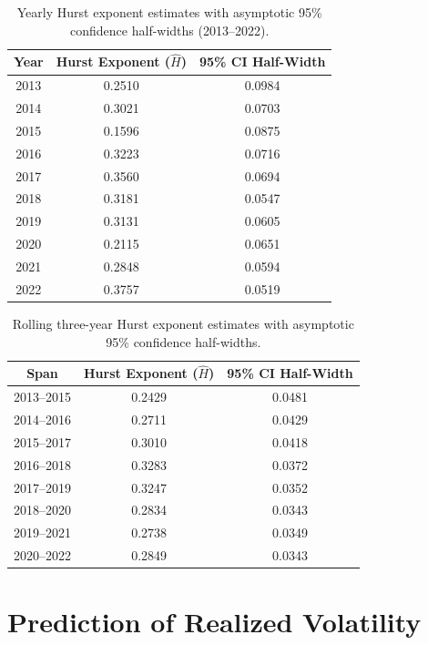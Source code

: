 \documentclass[ecta,nameyear,draft]{econsocart}
\def\wh{\widehat}
\newcommand{\1}{\mathbf 1}
\numberwithin{equation}{section}
\begin{document}
\begin{table}[htbp]
\centering
\begin{tabular}{ccc}
\toprule
\textbf{Year} & \textbf{Hurst Exponent ($\wh H$)} & \textbf{95\% CI Half-Width} \\
\midrule
2013 & 0.2510 & 0.0984 \\
2014 & 0.3021 & 0.0703 \\
2015 & 0.1596 & 0.0875 \\
2016 & 0.3223 & 0.0716 \\
2017 & 0.3560 & 0.0694 \\
2018 & 0.3181 & 0.0547 \\
2019 & 0.3131 & 0.0605 \\
2020 & 0.2115 & 0.0651 \\
2021 & 0.2848 & 0.0594 \\
2022 & 0.3757 & 0.0519 \\
\bottomrule
\end{tabular}
\caption{Yearly Hurst exponent estimates with asymptotic 95\% confidence half-widths (2013--2022).}
\label{tab:hurst_exponent}
\end{table}

\begin{table}[htbp]
\centering
\begin{tabular}{ccc}
\toprule
\textbf{Span} & \textbf{Hurst Exponent ($\wh H$)} & \textbf{95\% CI Half-Width} \\
\midrule
2013--2015 & 0.2429 & 0.0481 \\
2014--2016 & 0.2711 & 0.0429 \\
2015--2017 & 0.3010 & 0.0418 \\
2016--2018 & 0.3283 & 0.0372 \\
2017--2019 & 0.3247 & 0.0352 \\
2018--2020 & 0.2834 & 0.0343 \\
2019--2021 & 0.2738 & 0.0349 \\
2020--2022 & 0.2849 & 0.0343 \\
\bottomrule
\end{tabular}
\caption{Rolling three-year Hurst exponent estimates with asymptotic 95\% confidence half-widths.}
\label{tab:hurst_rolling}
\end{table}





\section{Prediction of Realized Volatility}
\label{sec:prediction}
\end{document}
